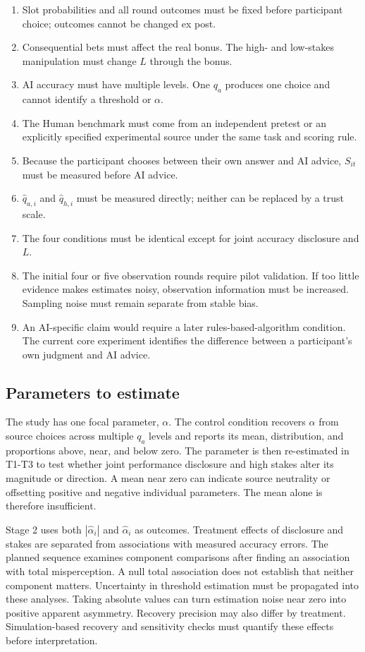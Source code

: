\documentclass[11pt,a4paper]{article}
\begin{document}
\begin{enumerate}
\item Slot probabilities and all round outcomes must be fixed before participant choice; outcomes cannot be changed ex post.
\item Consequential bets must affect the real bonus. The high- and low-stakes manipulation must change $L$ through the bonus.
\item AI accuracy must have multiple levels. One $q_a$ produces one choice and cannot identify a threshold or $\alpha$.
\item The Human benchmark must come from an independent pretest or an explicitly specified experimental source under the same task and scoring rule.
\item Because the participant chooses between their own answer and AI advice, $S_{it}$ must be measured before AI advice.
\item $\widehat q_{a,i}$ and $\widehat q_{h,i}$ must be measured directly; neither can be replaced by a trust scale.
\item The four conditions must be identical except for joint accuracy disclosure and $L$.
\item The initial four or five observation rounds require pilot validation. If too little evidence makes estimates noisy, observation information must be increased. Sampling noise must remain separate from stable bias.
\item An AI-specific claim would require a later rules-based-algorithm condition. The current core experiment identifies the difference between a participant's own judgment and AI advice.
\end{enumerate}

\subsection{Parameters to estimate}

The study has one focal parameter, $\alpha$. The control condition recovers $\alpha$ from source choices across multiple $q_a$ levels and reports its mean, distribution, and proportions above, near, and below zero. The parameter is then re-estimated in T1-T3 to test whether joint performance disclosure and high stakes alter its magnitude or direction. A mean near zero can indicate source neutrality or offsetting positive and negative individual parameters. The mean alone is therefore insufficient.

Stage 2 uses both $|\widehat\alpha_i|$ and $\widehat\alpha_i$ as outcomes. Treatment effects of disclosure and stakes are separated from associations with measured accuracy errors. The planned sequence examines component comparisons after finding an association with total misperception. A null total association does not establish that neither component matters. Uncertainty in threshold estimation must be propagated into these analyses. Taking absolute values can turn estimation noise near zero into positive apparent asymmetry. Recovery precision may also differ by treatment. Simulation-based recovery and sensitivity checks must quantify these effects before interpretation.
\end{document}
